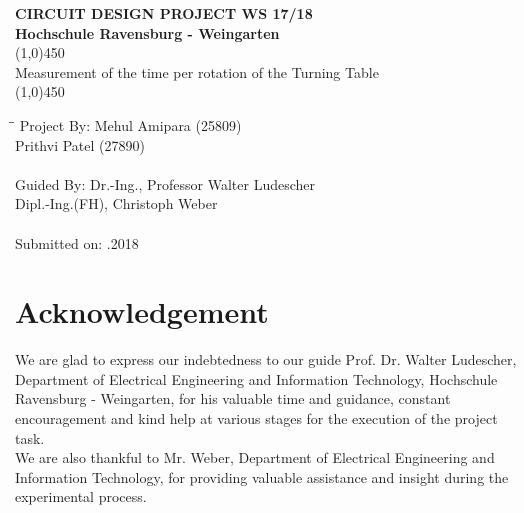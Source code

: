\documentclass[12pt,a4paper]{article}
\begin{document}
\begin{titlepage}
\begin{center}
\setcounter{page}{1}

\thispagestyle{a}
\vspace*{2cm}
\huge{\textbf{CIRCUIT DESIGN PROJECT WS 17/18}} \\[4mm]
\Large{\textbf{Hochschule Ravensburg - Weingarten}}\\ [1.5cm]

\line(1,0){450}\\
Measurement of the time per rotation of the Turning Table \\
\line(1,0){450}\\ [0.75cm]




\begin{tabbing}
\hspace{6cm}\=\hspace{4.5cm}\=\kill
 Project By: \> Mehul Amipara (25809)   \>  \\
  \> Prithvi Patel (27890) \>   \\ \\
 Guided By: \>Dr.-Ing., Professor Walter Ludescher  \>    \\ 
  \> Dipl.-Ing.(FH), Christoph Weber\>  \\ \\
 
   Submitted on:   .2018 \> 
\end{tabbing} 


\end{center}
\end{titlepage}

\newpage
\pagestyle{fancy}
\fancyfoot{}
\fancyhead{}

\setlength{\footskip=0pt}
\setlength{\headheight=35pt}

\newpage


\section*{Acknowledgement}

We are glad to express our indebtedness to our guide Prof. Dr. Walter Ludescher, Department of Electrical Engineering and Information Technology, Hochschule Ravensburg - Weingarten, for his valuable time and guidance, constant encouragement and kind help at various stages for the execution of the project task.\\

We are also thankful to Mr. Weber, Department of Electrical Engineering and Information Technology, for providing valuable assistance and insight during the experimental process.\\
\end{document}
